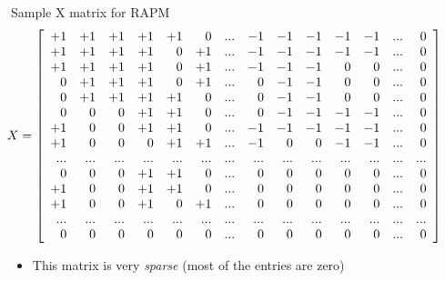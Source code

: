 \documentclass{beamer}
\begin{document}
  \begin{frame}{Sample X matrix for RAPM}
    $$
      \hspace{-9mm}
      X = \left[
        \begin{array}{*{20}r}
         +1 &+1 &+1 &+1 &+1 & 0 &...&-1 &-1 &-1 &-1 &-1 &...& 0\\
         +1 &+1 &+1 &+1 & 0 &+1 &...&-1 &-1 &-1 &-1 &-1 &...& 0\\
         +1 &+1 &+1 &+1 & 0 &+1 &...&-1 &-1 &-1 & 0 & 0 &...& 0\\
          0 &+1 &+1 &+1 & 0 &+1 &...& 0 &-1 &-1 & 0 & 0 &...& 0\\
          0 &+1 &+1 &+1 &+1 & 0 &...& 0 &-1 &-1 & 0 & 0 &...& 0\\
          0 & 0 & 0 &+1 &+1 & 0 &...& 0 &-1 &-1 &-1 &-1 &...& 0\\
         +1 & 0 & 0 &+1 &+1 & 0 &...&-1 &-1 &-1 &-1 &-1 &...& 0\\
         +1 & 0 & 0 & 0 &+1 &+1 &...&-1 & 0 & 0 &-1 &-1 &...& 0\\
         ...&...&...&...&...&...&...&...&...&...&...&...&...&...\\
          0 & 0 & 0 &+1 &+1 & 0 &...& 0 & 0 & 0 & 0 & 0 &...& 0\\
         +1 & 0 & 0 &+1 &+1 & 0 &...& 0 & 0 & 0 & 0 & 0 &...& 0\\
         +1 & 0 & 0 &+1 & 0 &+1 &...& 0 & 0 & 0 & 0 & 0 &...& 0\\
         ...&...&...&...&...&...&...&...&...&...&...&...&...&...\\
          0 & 0 & 0 & 0 & 0 & 0 &...& 0 & 0 & 0 & 0 & 0 &...& 0\\
        \end{array}
      \right]
    $$
    \begin{itemize}
      \item This matrix is very {\it sparse} (most of the entries are zero)
    \end{itemize}
  \end{frame}
\end{document}
